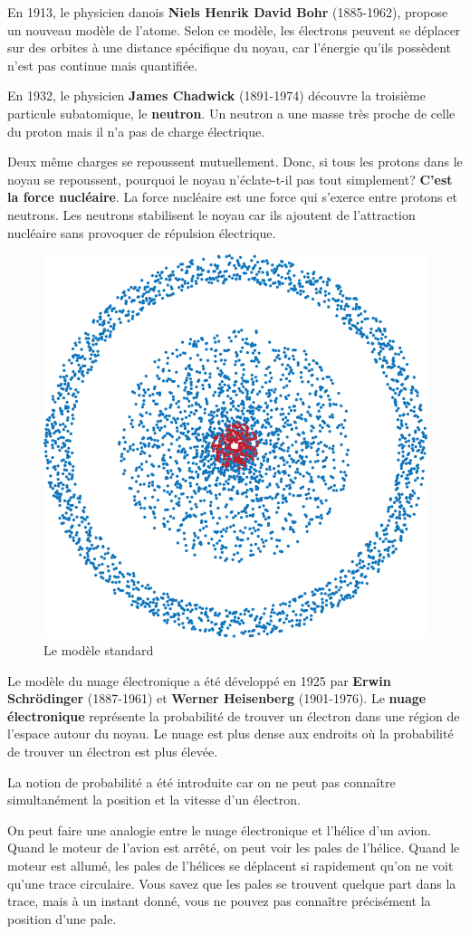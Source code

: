 \documentclass[
  11pt,
  french,
  a4paper,
  openany]{book}
\begin{document}
En 1913, le physicien danois \textbf{Niels Henrik David Bohr} (1885-1962), propose un nouveau modèle de l'atome. Selon ce modèle, les électrons peuvent se déplacer sur des orbites à une distance spécifique du noyau, car l'énergie qu'ils possèdent n'est pas continue mais quantifiée.

En 1932, le physicien \textbf{James Chadwick} (1891-1974) découvre la troisième particule subatomique, le \textbf{neutron}. Un neutron a une masse très proche de celle du proton mais il n'a pas de charge électrique.

Deux même charges se repoussent mutuellement. Donc, si tous les protons dans le noyau se repoussent, pourquoi le noyau n'éclate-t-il pas tout simplement? \textbf{C'est la force nucléaire}. La force nucléaire est une force qui s'exerce entre protons et neutrons. Les neutrons stabilisent le noyau car ils ajoutent de l'attraction nucléaire sans provoquer de répulsion électrique.

\begin{figure}

{\centering \includegraphics[width=0.25\linewidth]{images/modeles-atomiques-cloud} 

}

\caption{Le modèle standard}\label{fig:modeles-atomiques-cloud}
\end{figure}

Le modèle du nuage électronique a été développé en 1925 par \textbf{Erwin Schrödinger} (1887-1961) et \textbf{Werner Heisenberg} (1901-1976). Le \textbf{nuage électronique} représente la probabilité de trouver un électron dans une région de l'espace autour du noyau. Le nuage est plus dense aux endroits où la probabilité de trouver un électron est plus élevée.

La notion de probabilité a été introduite car on ne peut pas connaître simultanément la position et la vitesse d'un électron.

On peut faire une analogie entre le nuage électronique et l'hélice d'un avion. Quand le moteur de l'avion est arrêté, on peut voir les pales de l'hélice. Quand le moteur est allumé, les pales de l'hélices se déplacent si rapidement qu'on ne voit qu'une trace circulaire. Vous savez que les pales se trouvent quelque part dans la trace, mais à un instant donné, vous ne pouvez pas connaître précisément la position d'une pale.
\end{document}
